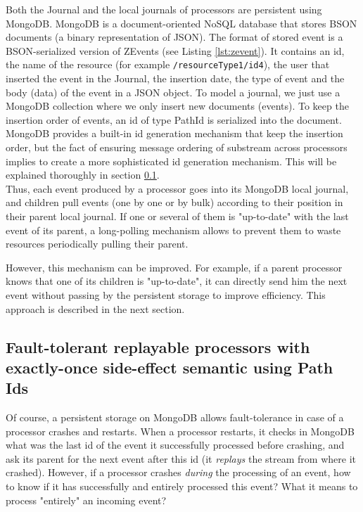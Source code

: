 Both the Journal and the local journals of processors are persistent using MongoDB. MongoDB is a document-oriented NoSQL database  that stores BSON documents (a binary representation of JSON). The format of stored event is a BSON-serialized version of ZEvents (see Listing \ref{lst:zevent}). It contains an id, the name of the resource (for example \verb|/resourceType1/id4|), the user that inserted the event in the Journal, the insertion date, the type of event and the body (data) of the event in a JSON object. To model a journal, we just use a MongoDB collection where we only insert new documents (events). To keep the insertion order of events, an id of type PathId is serialized
into the document. MongoDB provides a built-in id generation mechanism that keep the insertion order, but the fact of ensuring message ordering of substream across processors implies to create a more sophisticated id generation mechanism. This will be explained thoroughly in section \ref{sec:substreamproblem}.
\\

Thus, each event produced by a processor goes into its MongoDB local journal, and children pull events (one by one or by bulk) according to their position in their parent
local journal. If one or several of them is "up-to-date" with the last event of its parent, a long-polling mechanism allows to prevent them to waste resources periodically pulling their parent.

However, this mechanism can be improved. For example, if a parent processor knows that one of its children is "up-to-date", it can directly send him the next event without
passing by the persistent storage to improve efficiency. This approach is described in the next section.

\subsection{Fault-tolerant replayable processors with exactly-once side-effect semantic using Path Ids}
\label{sec:substreamproblem}

Of course, a persistent storage on MongoDB allows fault-tolerance in case of a processor crashes and restarts. When a processor restarts, it checks in MongoDB what was the
last id of the event it successfully processed before crashing, and ask its parent for the next event after this id (it \textit{replays} the stream from where it crashed).
However, if a processor crashes \textit{during} the processing of an event, how to know if it has successfully and entirely processed this event? What it means to process "entirely" an incoming event?
\\

